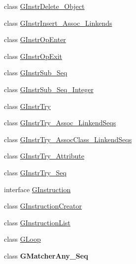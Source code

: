 \begin{DoxyCompactItemize}
\item 
class \hyperlink{classorg_1_1tzi_1_1use_1_1gen_1_1assl_1_1statics_1_1_g_instr_delete___object}{G\-Instr\-Delete\-\_\-\-Object}
\item 
class \hyperlink{classorg_1_1tzi_1_1use_1_1gen_1_1assl_1_1statics_1_1_g_instr_insert___assoc___linkends}{G\-Instr\-Insert\-\_\-\-Assoc\-\_\-\-Linkends}
\item 
class \hyperlink{classorg_1_1tzi_1_1use_1_1gen_1_1assl_1_1statics_1_1_g_instr_op_enter}{G\-Instr\-Op\-Enter}
\item 
class \hyperlink{classorg_1_1tzi_1_1use_1_1gen_1_1assl_1_1statics_1_1_g_instr_op_exit}{G\-Instr\-Op\-Exit}
\item 
class \hyperlink{classorg_1_1tzi_1_1use_1_1gen_1_1assl_1_1statics_1_1_g_instr_sub___seq}{G\-Instr\-Sub\-\_\-\-Seq}
\item 
class \hyperlink{classorg_1_1tzi_1_1use_1_1gen_1_1assl_1_1statics_1_1_g_instr_sub___seq___integer}{G\-Instr\-Sub\-\_\-\-Seq\-\_\-\-Integer}
\item 
class \hyperlink{classorg_1_1tzi_1_1use_1_1gen_1_1assl_1_1statics_1_1_g_instr_try}{G\-Instr\-Try}
\item 
class \hyperlink{classorg_1_1tzi_1_1use_1_1gen_1_1assl_1_1statics_1_1_g_instr_try___assoc___linkend_seqs}{G\-Instr\-Try\-\_\-\-Assoc\-\_\-\-Linkend\-Seqs}
\item 
class \hyperlink{classorg_1_1tzi_1_1use_1_1gen_1_1assl_1_1statics_1_1_g_instr_try___assoc_class___linkend_seqs}{G\-Instr\-Try\-\_\-\-Assoc\-Class\-\_\-\-Linkend\-Seqs}
\item 
class \hyperlink{classorg_1_1tzi_1_1use_1_1gen_1_1assl_1_1statics_1_1_g_instr_try___attribute}{G\-Instr\-Try\-\_\-\-Attribute}
\item 
class \hyperlink{classorg_1_1tzi_1_1use_1_1gen_1_1assl_1_1statics_1_1_g_instr_try___seq}{G\-Instr\-Try\-\_\-\-Seq}
\item 
interface \hyperlink{interfaceorg_1_1tzi_1_1use_1_1gen_1_1assl_1_1statics_1_1_g_instruction}{G\-Instruction}
\item 
class \hyperlink{classorg_1_1tzi_1_1use_1_1gen_1_1assl_1_1statics_1_1_g_instruction_creator}{G\-Instruction\-Creator}
\item 
class \hyperlink{classorg_1_1tzi_1_1use_1_1gen_1_1assl_1_1statics_1_1_g_instruction_list}{G\-Instruction\-List}
\item 
class \hyperlink{classorg_1_1tzi_1_1use_1_1gen_1_1assl_1_1statics_1_1_g_loop}{G\-Loop}
\item 
class {\bfseries G\-Matcher\-Any\-\_\-\-Seq}

\end{DoxyCompactItemize}
